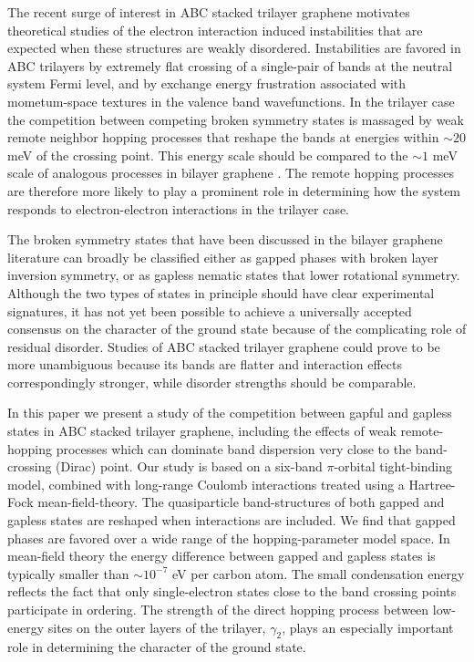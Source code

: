 \documentclass[twocolumn,prb,showpacs,preprintnumbers,amsmath,amssymb]{revtex4}
\begin{document}
The recent surge of interest in ABC stacked trilayer graphene 
\cite{trilayers1, trilayers2, trilayers3,abctri1,abctri2,abctri3,abctri4,abctri5,abctri6,abctri7,abctri8,abctri9}
motivates theoretical studies of the electron interaction induced instabilities that are  
expected when these structures are weakly disordered.  
Instabilities are favored in ABC trilayers by extremely flat crossing\cite{hongki1} of a single-pair 
of bands at the neutral system Fermi level, and by exchange energy frustration associated with 
mometum-space textures in the valence band wavefunctions.\cite{nobelsymposium}
In the trilayer case the competition between competing broken symmetry states is 
massaged by weak remote neighbor hopping processes that 
reshape the bands at energies within $\sim 20$ meV   
of the crossing point. \cite{trilayerbands} 
This energy scale should be compared to the 
$\sim 1$ meV scale of analogous processes in bilayer graphene \cite{mccann}.
The remote hopping processes are therefore more likely to 
play a prominent role in determining how the system responds to
electron-electron interactions
in the trilayer case.


The broken symmetry states that have been discussed
in the bilayer graphene literature can broadly be classified either as
gapped phases with broken layer inversion symmetry, \cite{hongki,jeilbilayer,fan,bilayers_gap} 
or as gapless nematic states that lower rotational symmetry. \cite{bilayers_nem}
Although the two types of states in principle should have clear experimental signatures,
it has not yet been possible\cite{jairo,geim,yacoby} to achieve a universally accepted consensus on the character of
the ground state because of the complicating role of residual disorder.
Studies of ABC stacked trilayer graphene could prove to be more unambiguous 
because its bands are flatter and interaction effects correspondingly stronger,
while disorder strengths should be comparable.

In this paper we present a study of the competition between gapful and gapless states in ABC stacked 
trilayer graphene, including the effects of weak remote-hopping processes which 
can dominate band dispersion very close to the band-crossing (Dirac) point.
Our study is based on a six-band $\pi$-orbital tight-binding model, 
combined with long-range Coulomb interactions treated using a Hartree-Fock 
mean-field-theory.  The quasiparticle band-structures of both gapped and gapless states  
are reshaped when interactions are included.  
We find that gapped phases are favored over a wide range
of the hopping-parameter model space.  In mean-field theory
the energy difference between gapped and gapless states is  
typically smaller than $\sim 10^{-7}$ eV per carbon atom.
The small condensation energy reflects the fact that only single-electron states close to the 
band crossing points participate in ordering.  The strength of the direct hopping process between
low-energy sites on the outer layers of the trilayer, $\gamma_2$, plays an especially
important role in determining the character of the ground state.   
\end{document}

